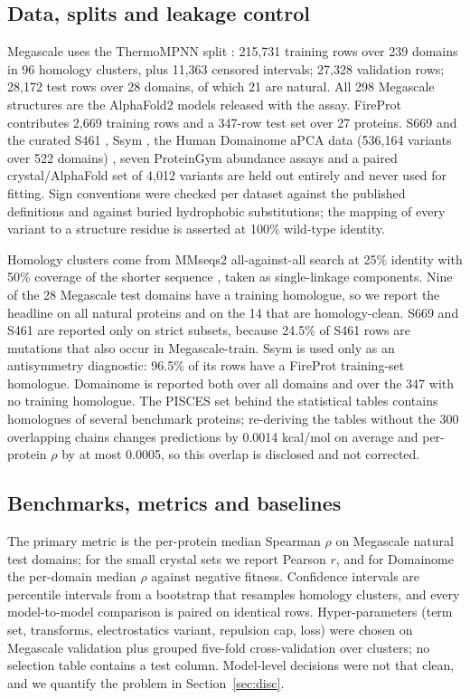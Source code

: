 \documentclass[unnumsec,webpdf,contemporary,large]{oup-authoring-template}
\begin{document}
\subsection{Data, splits and leakage control}

Megascale uses the ThermoMPNN split \citep{dieckhaus2024}: 215,731 training rows over 239 domains in 96 homology
clusters, plus 11,363 censored intervals; 27,328 validation rows; 28,172 test rows over 28 domains, of which 21
are natural. All 298 Megascale structures are the AlphaFold2 models released with the assay. FireProt
\citep{stourac2021} contributes 2,669 training rows and a 347-row test set over 27 proteins. S669 and the
curated S461 \citep{pancotti2022,hernandez2023}, Ssym \citep{pucci2018}, the Human Domainome aPCA data (536,164
variants over 522 domains) \citep{beltran2025}, seven ProteinGym abundance assays \citep{notin2023} and a paired
crystal/AlphaFold set of 4,012 variants are held out entirely and never used for fitting. Sign conventions were
checked per dataset against the published definitions and against buried hydrophobic substitutions; the mapping
of every variant to a structure residue is asserted at 100\% wild-type identity.

Homology clusters come from MMseqs2 all-against-all search at 25\% identity with 50\% coverage of the shorter
sequence \citep{steinegger2017}, taken as single-linkage components. Nine of the 28 Megascale test domains have a
training homologue, so we report the headline on all natural proteins and on the 14 that are homology-clean.
S669 and S461 are reported only on strict subsets, because 24.5\% of S461 rows are mutations that also occur in
Megascale-train. Ssym is used only as an antisymmetry diagnostic: 96.5\% of its rows have a FireProt
training-set homologue. Domainome is reported both over all domains and over the 347 with no training homologue.
The PISCES set behind the statistical tables contains homologues of several benchmark proteins; re-deriving the
tables without the 300 overlapping chains changes predictions by 0.0014 kcal/mol on average and per-protein
$\rho$ by at most 0.0005, so this overlap is disclosed and not corrected.

\subsection{Benchmarks, metrics and baselines}

The primary metric is the per-protein median Spearman $\rho$ on Megascale natural test domains; for the small
crystal sets we report Pearson $r$, and for Domainome the per-domain median $\rho$ against negative fitness.
Confidence intervals are percentile intervals from a bootstrap that resamples homology clusters, and every
model-to-model comparison is paired on identical rows. Hyper-parameters (term set, transforms, electrostatics
variant, repulsion cap, loss) were chosen on Megascale validation plus grouped five-fold cross-validation over
clusters; no selection table contains a test column. Model-level decisions were not that clean, and we quantify
the problem in Section~\ref{sec:disc}.
\end{document}
